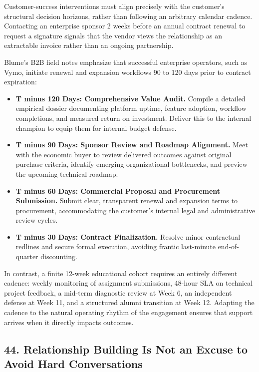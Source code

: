 Customer-success interventions must align precisely with the customer's structural decision horizons, rather than following an arbitrary calendar cadence. Contacting an enterprise sponsor 2 weeks before an annual contract renewal to request a signature signals that the vendor views the relationship as an extractable invoice rather than an ongoing partnership.

Blume's B2B field notes emphasize that successful enterprise operators, such as Vymo, initiate renewal and expansion workflows 90 to 120 days prior to contract expiration:
\begin{itemize}[leftmargin=*]
\item \textbf{T minus 120 Days: Comprehensive Value Audit.} Compile a detailed empirical dossier documenting platform uptime, feature adoption, workflow completions, and measured return on investment. Deliver this to the internal champion to equip them for internal budget defense.
\item \textbf{T minus 90 Days: Sponsor Review and Roadmap Alignment.} Meet with the economic buyer to review delivered outcomes against original purchase criteria, identify emerging organizational bottlenecks, and preview the upcoming technical roadmap.
\item \textbf{T minus 60 Days: Commercial Proposal and Procurement Submission.} Submit clear, transparent renewal and expansion terms to procurement, accommodating the customer's internal legal and administrative review cycles.
\item \textbf{T minus 30 Days: Contract Finalization.} Resolve minor contractual redlines and secure formal execution, avoiding frantic last-minute end-of-quarter discounting.
\end{itemize}

In contrast, a finite 12-week educational cohort requires an entirely different cadence: weekly monitoring of assignment submissions, 48-hour SLA on technical project feedback, a mid-term diagnostic review at Week 6, an independent defense at Week 11, and a structured alumni transition at Week 12. Adapting the cadence to the natural operating rhythm of the engagement ensures that support arrives when it directly impacts outcomes.

\subsection*{44. Relationship Building Is Not an Excuse to Avoid Hard Conversations}


